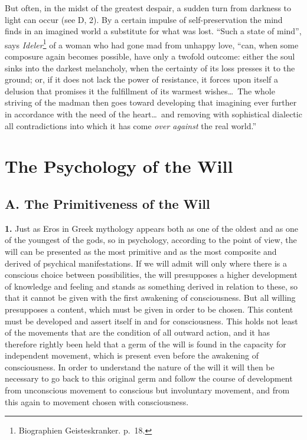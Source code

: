 \documentclass[12pt,a4paper]{book}
\newcommand{\opage}[1]{\marginnote{\footnotesize\textit{[#1]}}}
\begin{document}
But often, in the midst of the greatest despair, a sudden turn from
darkness to light can occur (see D, 2). By a certain impulse of
self-preservation the mind finds in an imagined world a substitute for
what was lost. ``Such a state of mind'', says
\emph{Ideler}\footnote{Biographien Geisteskranker. p.~18.} of a woman
who had gone mad from unhappy love, ``can, when some composure again
becomes possible, have only a twofold outcome: either the soul sinks
into the darkest melancholy, when the certainty of its loss presses it
\opage{364}to the ground; or, if it does not lack the power of
resistance, it forces upon itself a delusion that promises it the
fulfillment of its warmest wishes\ldots\ The whole striving of the
madman then goes toward developing that imagining ever further in
accordance with the need of the heart\ldots\ and removing with
sophistical dialectic all contradictions into which it has come
\emph{over against} the real world.''


\chapter[The Psychology of the Will]{The Psychology of the Will\opage{365}}
\label{ch:will}

\section*{A. The Primitiveness of the Will}

\textbf{1.} Just as Eros in Greek mythology appears both as one of the
oldest and as one of the youngest of the gods, so in psychology, according
to the point of view, the will can be presented as the most primitive and
as the most composite and derived of psychical manifestations. If we will
admit will only where there is a conscious choice between possibilities,
the will presupposes a higher development of knowledge and feeling and
stands as something derived in relation to these, so that it cannot be
given with the first awakening of consciousness. But all willing
presupposes a content, which must be given in order to be chosen. This
content must be developed and assert itself in and for consciousness. This
holds not least of the movements that are the condition of all outward
action, and it has therefore rightly been held that a germ of the will is
found in the capacity for independent movement, which is present even
before the awakening of consciousness. In order to understand the nature
of the will it will then be necessary to go back to this original germ and
follow the course of development from unconscious movement to conscious
but involuntary movement, and from this again to movement chosen with
consciousness.
\end{document}
